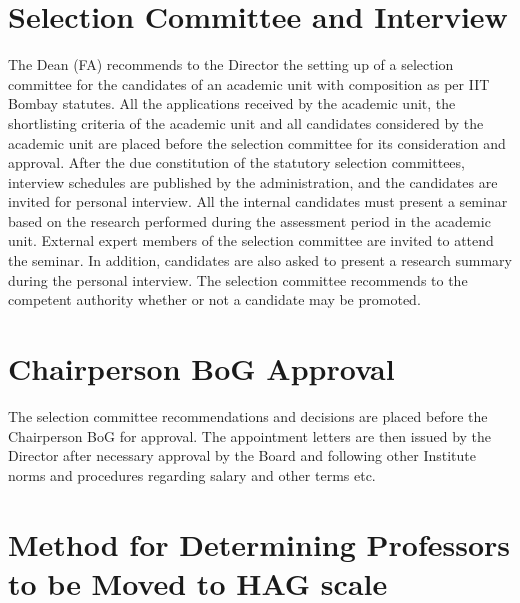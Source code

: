 \documentclass[
  10pt,
  a5paper,
  10pt,
  openany]{amsbook}
\begin{document}
\section{Selection Committee and
Interview}\label{selection-committee-and-interview}

The Dean (FA) recommends to the Director the setting up of a selection
committee for the candidates of an academic unit with composition as per
IIT Bombay statutes. All the applications received by the academic unit,
the shortlisting criteria of the academic unit and all candidates
considered by the academic unit are placed before the selection
committee for its consideration and approval. After the due constitution
of the statutory selection committees, interview schedules are published
by the administration, and the candidates are invited for personal
interview. All the internal candidates must present a seminar based on
the research performed during the assessment period in the academic
unit. External expert members of the selection committee are invited to
attend the seminar. In addition, candidates are also asked to present a
research summary during the personal interview. The selection committee
recommends to the competent authority whether or not a candidate may be
promoted.

\section{Chairperson BoG Approval}\label{chairperson-bog-approval}

The selection committee recommendations and decisions are placed before
the Chairperson BoG for approval. The appointment letters are then
issued by the Director after necessary approval by the Board and
following other Institute norms and procedures regarding salary and
other terms etc.

\section{Method for Determining Professors to be Moved to HAG
scale}\label{method-for-determining-professors-to-be-moved-to-hag-scale}
\end{document}
